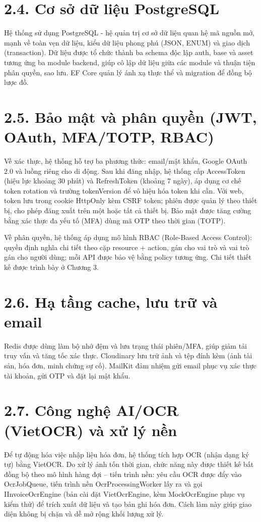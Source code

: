 \section*{2.4. Cơ sở dữ liệu PostgreSQL}
Hệ thống sử dụng PostgreSQL - hệ quản trị cơ sở dữ liệu quan hệ mã nguồn mở, mạnh về toàn vẹn dữ liệu, kiểu dữ liệu phong phú (JSON, ENUM) và giao dịch (transaction). Dữ liệu được tổ chức thành ba schema độc lập auth, base và asset tương ứng ba module backend, giúp cô lập dữ liệu giữa các module và thuận tiện phân quyền, sao lưu. EF Core quản lý ánh xạ thực thể và migration để đồng bộ lược đồ.

\section*{2.5. Bảo mật và phân quyền (JWT, OAuth, MFA/TOTP, RBAC)}
Về xác thực, hệ thống hỗ trợ ba phương thức: email/mật khẩu, Google OAuth 2.0 và luồng riêng cho di động. Sau khi đăng nhập, hệ thống cấp AccessToken (hiệu lực khoảng 30 phút) và RefreshToken (khoảng 7 ngày), áp dụng cơ chế token rotation và trường tokenVersion để vô hiệu hóa token khi cần. Với web, token lưu trong cookie HttpOnly kèm CSRF token; phiên được quản lý theo thiết bị, cho phép đăng xuất trên một hoặc tất cả thiết bị. Bảo mật được tăng cường bằng xác thực đa yếu tố (MFA) dùng mã OTP theo thời gian (TOTP).

Về phân quyền, hệ thống áp dụng mô hình RBAC (Role-Based Access Control): quyền định nghĩa chi tiết theo cặp resource + action, gán cho vai trò và vai trò gán cho người dùng; mỗi API được bảo vệ bằng policy tương ứng. Chi tiết thiết kế được trình bày ở Chương 3.

\section*{2.6. Hạ tầng cache, lưu trữ và email}
Redis được dùng làm bộ nhớ đệm và lưu trạng thái phiên/MFA, giúp giảm tải truy vấn và tăng tốc xác thực. Cloudinary lưu trữ ảnh và tệp đính kèm (ảnh tài sản, hóa đơn, minh chứng sự cố). MailKit đảm nhiệm gửi email phục vụ xác thực tài khoản, gửi OTP và đặt lại mật khẩu.

\section*{2.7. Công nghệ AI/OCR (VietOCR) và xử lý nền}
Để tự động hóa việc nhập liệu hóa đơn, hệ thống tích hợp OCR (nhận dạng ký tự) bằng VietOCR. Do xử lý ảnh tốn thời gian, chức năng này được thiết kế bất đồng bộ theo mô hình hàng đợi – tiến trình nền: yêu cầu OCR được đẩy vào OcrJobQueue, tiến trình nền OcrProcessingWorker lấy ra và gọi IInvoiceOcrEngine (bản cài đặt VietOcrEngine, kèm MockOcrEngine phục vụ kiểm thử) để trích xuất dữ liệu và tạo bản ghi hóa đơn. Cách làm này giúp giao diện không bị chặn và dễ mở rộng khối lượng xử lý.

